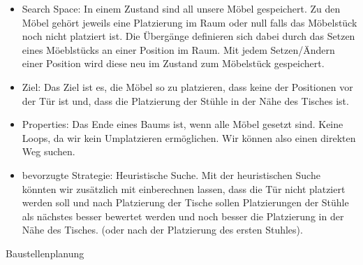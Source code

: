 \documentclass[ngerman]{fbi-aufgabenblatt}
\begin{document}
\begin{itemize}
    \item Search Space: In einem Zustand sind all unsere Möbel gespeichert. Zu den Möbel gehört jeweils eine Platzierung im Raum oder null falls das Möbelstück noch nicht platziert ist. Die Übergänge definieren sich dabei durch das Setzen eines Möeblstücks an einer Position im Raum. Mit jedem Setzen/Ändern einer Position wird diese neu im Zustand zum Möbelstück gespeichert.

    
    \item Ziel: Das Ziel ist es, die Möbel so zu platzieren, dass keine der Positionen vor der Tür ist und, dass die Platzierung der Stühle in der Nähe des Tisches ist.


    \item Properties: Das Ende eines Baums ist, wenn alle Möbel gesetzt sind. Keine Loops, da wir kein Umplatzieren ermöglichen. Wir können also einen direkten Weg suchen.

    \item bevorzugte Strategie: Heuristische Suche. Mit der heuristischen Suche könnten wir zusätzlich mit einberechnen lassen, dass die Tür nicht platziert werden soll und nach Platzierung der Tische sollen Platzierungen der Stühle als nächstes besser bewertet werden und noch besser die Platzierung in der Nähe des Tisches. (oder nach der Platzierung des ersten Stuhles).
\end{itemize}

Baustellenplanung
\end{document}
